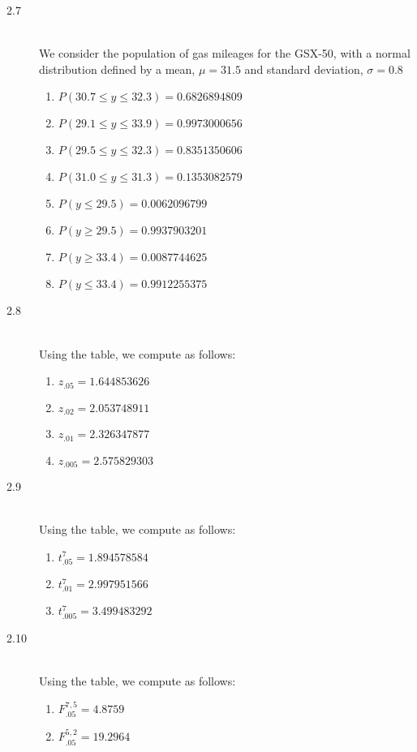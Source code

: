 \documentclass[letterpaper,10pt]{article}
\begin{document}
\begin{description}
\item[2.7]\hfill \\
We consider the population of gas mileages for the GSX-50, with a normal distribution defined by a mean, $\mu=31.5$ and standard deviation, $\sigma=0.8$
\begin{enumerate}[label=\alph*.]
\item $P(30.7\leq y \leq 32.3)=0.6826894809$
\item $P(29.1\leq y \leq 33.9)=0.9973000656$
\item $P(29.5\leq y \leq 32.3)=0.8351350606$
\item $P(31.0\leq y \leq 31.3)=0.1353082579$
\item $P(y\leq 29.5)=0.0062096799$
\item $P(y\geq 29.5)=0.9937903201$
\item $P(y\geq 33.4)=0.0087744625$
\item $P(y\leq 33.4)=0.9912255375$
\end{enumerate}

\item[2.8]\hfill \\
Using the table, we compute as follows:
\begin{enumerate}[label=\alph*.]
\item $z_{.05}=1.644853626$
\item $z_{.02}=2.053748911$
\item $z_{.01}=2.326347877$
\item $z_{.005}=2.575829303$
\end{enumerate}

\item[2.9]\hfill \\
Using the table, we compute as follows:
\begin{enumerate}[label=\alph*.]
\item $t^7_{.05}=1.894578584$
\item $t^7_{.01}=2.997951566$
\item $t^7_{.005}=3.499483292$
\end{enumerate}
\item[2.10]\hfill
 \\
Using the table, we compute as follows:
\begin{enumerate}[label=\alph*.]
\item $F^{7,5}_{.05}=4.8759$
\item $F^{5,2}_{.05}=19.2964$
\end{enumerate}


\end{description}
\end{document}
